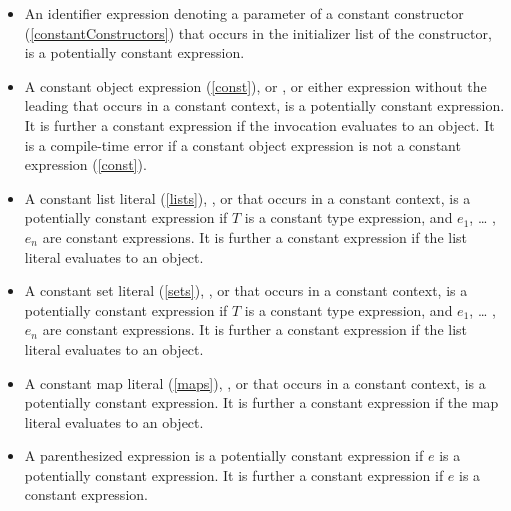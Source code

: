 \documentclass[makeidx]{article}
\begin{document}
{\begin{itemize}
\item An identifier expression denoting a parameter of a constant constructor (\ref{constantConstructors}) that occurs in the initializer list of the constructor, is a potentially constant expression.

\item A constant object expression (\ref{const}),
 or
,
or either expression without the leading \CONST{} that occurs in a constant context, is a potentially constant expression.
It is further a constant expression if the invocation evaluates to an object.
It is a compile-time error if a constant object expression is
not a constant expression (\ref{const}).

\item A constant list literal (\ref{lists}),
, or
that occurs in a constant context, is a potentially constant expression if $T$ is a constant type expression, and $e_1$, \ldots{} , $e_n$ are constant expressions.
It is further a constant expression if the list literal evaluates to an object.

\item A constant set literal (\ref{sets}),
, or
that occurs in a constant context, is a potentially constant expression if $T$ is a constant type expression, and $e_1$, \ldots{} , $e_n$ are constant expressions.
It is further a constant expression if the list literal evaluates to an object.

\item A constant map literal (\ref{maps}),
, or
 that occurs in a constant context,
is a potentially constant expression.
It is further a constant expression if the map literal evaluates to an object.

\item A parenthesized expression  is a potentially constant expression if $e$ is a potentially constant expression. It is further a constant expression if $e$ is a constant expression.


\end{itemize}}
\end{document}

